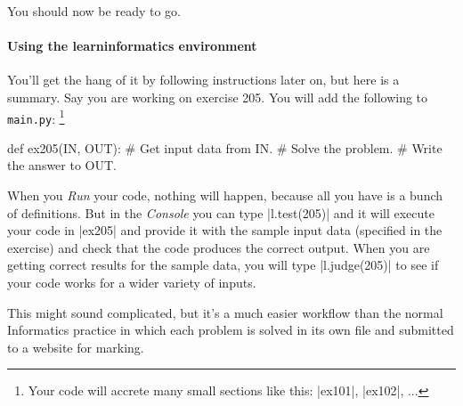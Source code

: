 You should now be ready to go.

\paragraph{Using the learninformatics environment} You'll get the hang of it by following
instructions later on, but here is a summary. Say you are working on exercise 205. You
will add the following to \texttt{main.py}:%
\footnote{Your code will accrete many small sections like this: \pycode|ex101|,
  \pycode|ex102|, ...}
\begin{pythoncode}
  def ex205(IN, OUT):
    # Get input data from IN.
    # Solve the problem.
    # Write the answer to OUT.
\end{pythoncode}

When you \emph{Run} your code, nothing will happen, because all you have is a bunch of
definitions. But in the \emph{Console} you can type \pycode|l.test(205)| and it will
execute your code in \pycode|ex205| and provide it with the sample input data (specified
in the exercise) and check that the code produces the correct output. When you are getting
correct results for the sample data, you will type \pycode|l.judge(205)| to see if your
code works for a wider variety of inputs.

This might sound complicated, but it's a much easier workflow than the normal Informatics
practice in which each problem is solved in its own file and submitted to a website for
marking.

